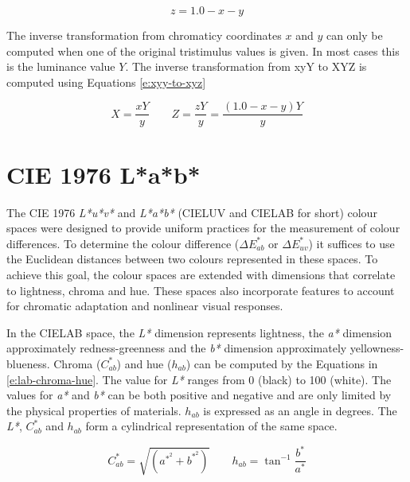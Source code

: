 \begin{equation}
z = 1.0 - x - y
\label{e:xy-to-z}
\end{equation}

The inverse transformation from chromaticy coordinates $x$ and $y$ can
only be computed when one of the original tristimulus values is
given. In most cases this is the luminance value $Y$. The inverse
transformation from xyY to XYZ is computed using Equations
\ref{e:xyy-to-xyz}

\begin{equation}
X = \frac{xY}{y} \qquad
Z = \frac{zY}{y} =  \frac{(1.0-x-y)Y}{y}
\label{e:xyy-to-xyz}
\end{equation}

\section{CIE 1976 L*a*b*}
\label{s:lab}


The CIE 1976 \emph{L*u*v*} and \emph{L*a*b*} (CIELUV and CIELAB for
short) colour spaces were designed to provide uniform practices for
the measurement of colour differences. To determine the colour
difference ($\Delta E^*_{ab}$ or $\Delta E^*_{uv}$) it suffices to use
the Euclidean distances between two colours represented in these
spaces. To achieve this goal, the colour spaces are extended with
dimensions that correlate to lightness, chroma and hue. These spaces
also incorporate features to account for chromatic adaptation and
nonlinear visual responses.

In the CIELAB space, the \emph{L*} dimension represents lightness, the
\emph{a*} dimension approximately redness-greenness and the \emph{b*}
dimension approximately yellow\-ness-blueness. Chroma ($C^*_{ab}$) and
hue ($h_{ab}$) can be computed by the Equations in
\ref{e:lab-chroma-hue}. The value for \emph{L*} ranges from 0 (black)
to 100 (white). The values for \emph{a*} and \emph{b*} can be both
positive and negative and are only limited by the physical properties
of materials.  $h_{ab}$ is expressed as an angle in degrees. The
\emph{L*}, $C^*_{ab}$ and $h_{ab}$ form a cylindrical representation
of the same space.

\begin{equation}
C^*_{ab} = \sqrt{\left(a^{*^2} + b^{*^2} \right)} \qquad h_{ab} = \tan^{-1} \frac{b^*}{a^*}
\label{e:lab-chroma-hue}
\end{equation}

